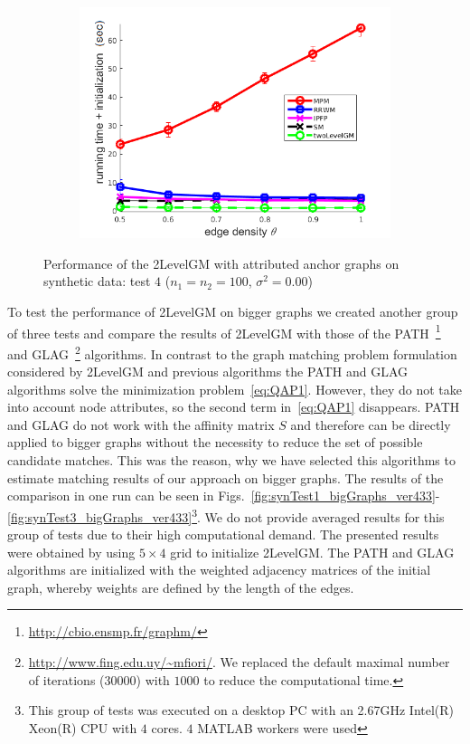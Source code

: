 \begin{figure}[h]
\begin{subfigure}[b]{0.33\textwidth}
			\includegraphics[scale=0.33]{"chapter3/fig/SyntheticTest/descr/Results_v4.3.3/Test4/time_summary_avg10t"} 
		\end{subfigure} 	
	\caption[Performance of the 2LevelGM with attributed anchor graphs on synthetic data (test $4$)]{Performance of the 2LevelGM with attributed anchor graphs on synthetic data: test $4$ ($n_1=n_2=100$, $\sigma^2=0.00$)}
	\label{fig:synTest4_descr_ver433}
\end{figure}

To test the performance of 2LevelGM on bigger graphs we created another group of three tests and compare the results of 2LevelGM with those of the  PATH~\cite{Zazlavskiy2008_PATH}\footnote{\url{http://cbio.ensmp.fr/graphm/}} and GLAG~\cite{Fiori2013_GLAG}\footnote{\url{http://www.fing.edu.uy/~mfiori/}. We replaced the default maximal number of iterations ($30000$) with $1000$ to reduce the computational time.} algorithms. In contrast to the graph matching problem formulation considered by 2LevelGM and previous algorithms the PATH and GLAG algorithms solve the minimization problem~\eqref{eq:QAP1}. However, they do not take into account node attributes, so the second term in~\eqref{eq:QAP1} disappears. PATH and GLAG do not work with the affinity matrix $S$ and therefore can be directly applied to bigger graphs without the necessity to reduce the set of possible candidate matches. This was the reason, why we have selected this algorithms to estimate matching results of our approach on bigger graphs. The results of the comparison in one run can be seen in Figs.~\ref{fig:synTest1_bigGraphs_ver433}-\ref{fig:synTest3_bigGraphs_ver433}\footnote{This group of tests was executed on a desktop PC with an 2.67GHz Intel(R) Xeon(R) CPU with $4$ cores. $4$ MATLAB workers were used}. We do not provide averaged results for this group of tests due to their high computational demand. The presented results were obtained by using $5\times 4$ grid to initialize 2LevelGM. The PATH and GLAG algorithms are initialized with the weighted adjacency matrices of the initial graph, whereby weights are defined by the length of the edges.
\FloatBarrier


